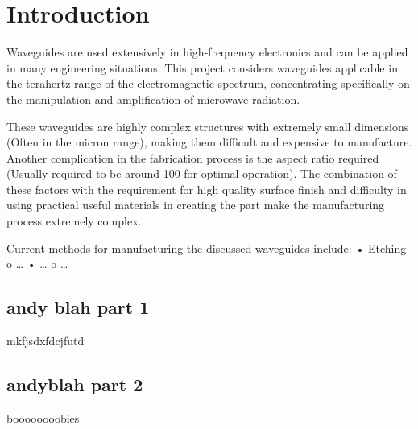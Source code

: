 \section{Introduction}
Waveguides are used extensively in high-frequency electronics and can be applied in many engineering situations. This project considers waveguides applicable in the terahertz range of the electromagnetic spectrum, concentrating specifically on the manipulation and amplification of microwave radiation.

These waveguides are highly complex structures with extremely small dimensions (Often in the micron range), making them difficult and expensive to manufacture. Another complication in the fabrication process is the aspect ratio required (Usually required to be around 100 for optimal operation). The combination of these factors with the requirement for high quality surface finish and difficulty in using practical useful materials in creating the part make the manufacturing process extremely complex.

Current methods for manufacturing the discussed waveguides include:
•	Etching
o	…
•	…
o	…


\subsection{andy blah part 1}
mkfjsdxfdcjfutd

\subsection{andyblah part 2}
boooooooobies